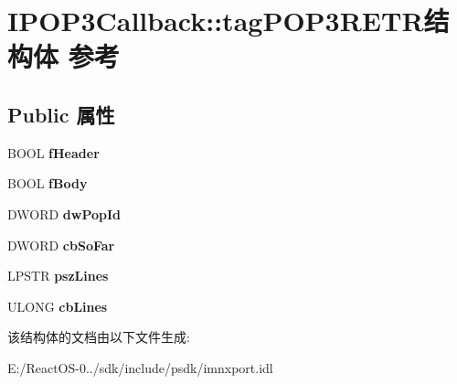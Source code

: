 \hypertarget{struct_i_p_o_p3_callback_1_1tag_p_o_p3_r_e_t_r}{}\section{I\+P\+O\+P3\+Callback\+:\+:tag\+P\+O\+P3\+R\+E\+T\+R结构体 参考}
\label{struct_i_p_o_p3_callback_1_1tag_p_o_p3_r_e_t_r}
\subsection*{Public 属性}
\begin{DoxyCompactItemize}
\item 
\mbox{\label{struct_i_p_o_p3_callback_1_1tag_p_o_p3_r_e_t_r_ace18bdd0cc897ec4b2e6dacb2c9f39f9}} 
B\+O\+OL {\bfseries f\+Header}
\item 
\mbox{\label{struct_i_p_o_p3_callback_1_1tag_p_o_p3_r_e_t_r_a015fcc49a5d793455fc853e8820d6ebc}} 
B\+O\+OL {\bfseries f\+Body}
\item 
\mbox{\label{struct_i_p_o_p3_callback_1_1tag_p_o_p3_r_e_t_r_ad0ee45848fcdc7f0bb46791fb4947166}} 
D\+W\+O\+RD {\bfseries dw\+Pop\+Id}
\item 
\mbox{\label{struct_i_p_o_p3_callback_1_1tag_p_o_p3_r_e_t_r_ade9f400b768e5cd0972162cb6766b6a3}} 
D\+W\+O\+RD {\bfseries cb\+So\+Far}
\item 
\mbox{\label{struct_i_p_o_p3_callback_1_1tag_p_o_p3_r_e_t_r_ad3ae08ce0fa6218e35e15cd61d871ae7}} 
L\+P\+S\+TR {\bfseries psz\+Lines}
\item 
\mbox{\label{struct_i_p_o_p3_callback_1_1tag_p_o_p3_r_e_t_r_aaf415658d9be7cd450e56d005a749115}} 
U\+L\+O\+NG {\bfseries cb\+Lines}
\end{DoxyCompactItemize}


该结构体的文档由以下文件生成\+:\begin{DoxyCompactItemize}
\item 
E\+:/\+React\+O\+S-\/0../sdk/include/psdk/imnxport.\+idl\end{DoxyCompactItemize}
